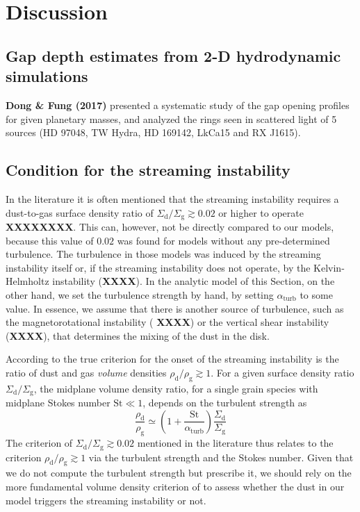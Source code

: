 \documentclass{aa}
\begin{document}
\section{Discussion}


\subsection{Gap depth estimates from 2-D hydrodynamic simulations}

{\bf Dong \& Fung (2017)} presented a systematic study of the gap
opening profiles for given planetary masses, and analyzed the
rings seen in scattered light of 5 sources (HD 97048, TW Hydra,
HD 169142, LkCa15 and RX J1615).


\subsection{Condition for the streaming instability}
In the literature it is often mentioned that the streaming instability requires
a dust-to-gas surface density ratio of
$\Sigma_{\mathrm{d}}/\Sigma_{\mathrm{g}}\gtrsim 0.02$ or higher to operate {\bf
  XXXXXXXX}. This can, however, not be directly compared to our models, because
this value of $0.02$ was found for models without any pre-determined
turbulence. The turbulence in those models was induced by the streaming
instability itself or, if the streaming instability does not operate, by the
Kelvin-Helmholtz instability ({\bf XXXX}). In the analytic model of this
Section, on the other hand, we set the turbulence strength by hand, by setting
$\alpha_{\mathrm{turb}}$ to some value. In essence, we assume that there is
another source of turbulence, such as the magnetorotational instability ({\bf
  XXXX}) or the vertical shear instability ({\bf XXXX}), that determines the
mixing of the dust in the disk.

According to \citet{2005ApJ...620..459Y} the true criterion for the onset of the
streaming instability is the ratio of dust and gas {\em volume} densities
$\rho_{\mathrm{d}}/\rho_{\mathrm{g}}\gtrsim 1$. For a given surface density
ratio $\Sigma_{\mathrm{d}}/\Sigma_{\mathrm{g}}$, the midplane volume density
ratio, for a single grain species with midplane Stokes number $\mathrm{St}\ll
1$, depends on the turbulent strength as
\begin{equation}\label{eq-dtg-sig-vs-rho}
  \frac{\rho_{\mathrm{d}}}{\rho_{\mathrm{g}}}\simeq
  \left(1+\frac{\mathrm{St}}{\alpha_{\mathrm{turb}}}\right)
  \frac{\Sigma_{\mathrm{d}}}{\Sigma_{\mathrm{g}}}
\end{equation}
The criterion of $\Sigma_{\mathrm{d}}/\Sigma_{\mathrm{g}}\gtrsim 0.02$ mentioned
in the literature thus relates to the criterion
$\rho_{\mathrm{d}}/\rho_{\mathrm{g}}\gtrsim 1$ via the turbulent strength and
the Stokes number. Given that we do not compute the turbulent strength
but prescribe it, we should rely on the more fundamental volume density
criterion of \citet{2005ApJ...620..459Y} to assess whether the dust in our
model triggers the streaming instability or not.
\end{document}

